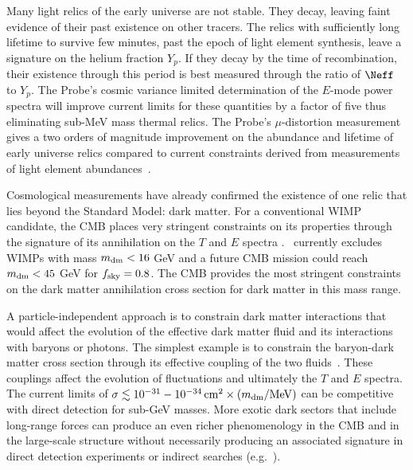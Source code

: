 Many light relics of the early universe are not stable. They decay, 
leaving faint evidence of their past existence on other tracers. The relics with sufficiently long lifetime to survive few minutes, 
past the epoch of light element synthesis, leave a signature on the helium fraction $Y_p$.  If they decay 
by the time of recombination, their existence through this period is best measured through the ratio of $\Neff$ to $Y_p$. 
The Probe's cosmic variance limited determination 
of the $E$-mode power spectra will improve current limits for these quantities by
a factor of five thus eliminating sub-MeV mass thermal relics. 
The Probe's $\mu$-distortion measurement gives a two orders of magnitude improvement on the 
abundance and lifetime of early universe relics compared 
to current constraints derived from measurements of light element 
abundances~\cite{Chluba2013fore, Chluba2013PCA,Kawasaki2005, Jedamzik2006}.

Cosmological measurements have already confirmed the existence of one relic that lies beyond the 
Standard Model: dark matter. For a conventional WIMP candidate, the CMB places very stringent 
constraints on its properties through the signature of its annihilation on the $T$ and $E$ 
spectra \citep{Peebles2000, Chen2004, Padmanabhan2005}.  \planck\ currently excludes WIMPs with mass 
$m_{\rm dm}< 16$ GeV and a future CMB mission could reach $m_{\rm dm} < 45$ GeV for $f_{\rm sky} =0.8$.  The 
CMB provides the most stringent constraints on the dark matter annihilation cross section for dark matter 
in this mass range.  


A particle-independent approach is to constrain dark matter interactions that would 
affect the evolution of the effective dark matter fluid and its interactions with baryons or photons.  The simplest example is 
to constrain the baryon-dark matter cross section through its effective coupling of the two fluids~\cite{Dvorkin:2013cea}.  
These couplings affect the evolution of fluctuations and ultimately the $T$ and $E$ spectra. The current limits of $\sigma \lesssim 10^{-31}-10^{-34}\,{\rm cm}^2 \times (m_{\rm dm} / {\rm MeV})$ can be competitive with direct detection for sub-GeV masses.  
More exotic dark sectors that include long-range forces can produce an even richer phenomenology in the CMB and in the large-scale structure 
without necessarily producing an associated signature in direct detection experiments or 
indirect searches (e.g.~\cite{Cyr-Racine:2013fsa,Buen-Abad:2015ova,Lesgourgues:2015wza}). 

